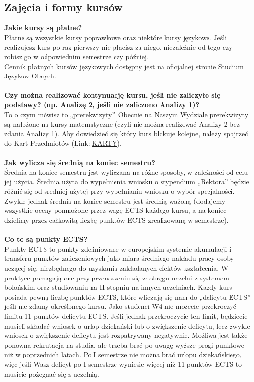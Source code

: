 \documentclass[11pt]{article}
\begin{document}
\subsection{Zajęcia i formy kursów}
\textbf{Jakie kursy są płatne?}\\
\indent Płatne są wszystkie kursy poprawkowe oraz niektóre kursy językowe. Jeśli realizujesz kurs po raz pierwszy nie płacisz za niego, niezależnie od tego czy robisz go w odpowiednim semestrze czy później. \\
\indent Cennik płatnych kursów językowych dostępny jest na oficjalnej stronie Studium Języków Obcych:
{} \\\\
\textbf{Czy można realizować kontynuację kursu, jeśli nie zaliczyło się podstawy? (np. Analizę 2, jeśli nie zaliczono Analizy 1)?} \\
\indent To o czym mówisz to „prerekwizyty”. Obecnie na Naszym Wydziale prerekwizyty są nałożone na kursy matematyczne (czyli nie można realizować Analizy 2 bez zdania Analizy 1). Aby dowiedzieć się który kurs blokuje kolejne, należy spojrzeć do Kart Przedmiotów (Link: {\color{blue}\href{http://weka.pwr.edu.pl/studenci/plany-i-programy-studiow/karty-przedmiotow}{KARTY}}). \\\\
\textbf{Jak wylicza się średnią na koniec semestru?} \\
\indent Średnia na koniec semestru jest wyliczana na różne sposoby, w zależności od celu jej użycia. Średnia użyta do wypełnienia wniosku o stypendium „Rektora” będzie różnić się od średniej użytej przy wypełnianiu wniosku o wybór specjalności. Zwykle jednak średnia na koniec semestru jest średnią ważoną (dodajemy wszystkie oceny pomnożone przez wagę ECTS każdego kursu, a na koniec dzielimy przez całkowitą liczbę punktów ECTS zrealizowaną w semestrze). \\\\
\textbf{Co to są punkty ECTS?} \\
\indent Punkty ECTS to punkty zdefiniowane w europejskim systemie akumulacji i transferu punktów zaliczeniowych jako miara średniego nakładu pracy osoby uczącej się, niezbędnego do uzyskania zakładanych efektów kształcenia. W praktyce pomagają one przy przenoszeniu się w okręgu uczelni z systemem bolońskim oraz studiowaniu na II stopniu na innych uczelniach. Każdy kurs posiada pewną liczbę punktów ECTS, które wliczają się nam do „deficytu ECTS” jeśli nie zdamy określonego kursu. Jako studenci W4 nie możecie przekroczyć limitu 11 punktów deficytu ECTS. Jeśli jednak przekroczycie ten limit, będziecie musieli składać wniosek o urlop dziekański lub o zwiększenie deficytu, lecz zwykle wniosek o zwiększenie deficytu jest rozpatrywany negatywnie. Możliwa jest także ponowna rekrutacja na studia, ale trzeba brać po uwagę wyższe progi punktowe niż w poprzednich latach. Po I semestrze nie można brać urlopu dziekańskiego, więc jeśli Wasz deficyt po I semestrze wyniesie więcej niż 11 punktów ECTS to musicie pożegnać się z uczelnią. \\\\
\end{document}
